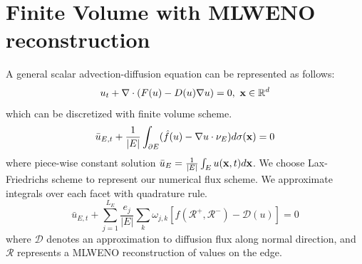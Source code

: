 \section{Finite Volume with MLWENO reconstruction}
A general scalar advection-diffusion equation can be represented as follows:
\begin{equation} \label{eq:newad}
		  u_t + \div (F(u) - D(u) \nabla u) = 0, \ \bfx\in\Re^d
\end{equation}
which can be discretized with finite volume scheme.
\begin{equation}\label{eq:newfv}
		  \bar u_{E,t} + \frac{1}{|E|} \int_{\partial E} (\hat f(u) - \nabla u \cdot \nu_E) d\sigma(\bfx) = 0
\end{equation}
where piece-wise constant solution $\bar{u}_E = \frac{1}{|E|}\int_{E} u({\mathbf x}, t) d{\mathbf x}$. We choose Lax-Friedrichs scheme to
represent our numerical flux scheme.
We approximate integrals over each facet with quadrature rule.
\begin{equation*}
\bar{u}_{E,t} + \sum_{j=1}^{L_E} \frac{e_j}{|E|} \sum_{k} \omega_{j,k} [\hat{f}(\mathscr{R}^+, \mathscr{R}^-) - \mathscr{D}(u)] = 0
\end{equation*}
where $\mathscr{D}$ denotes an approximation to diffusion flux along normal direction, and $\mathscr{R}$ represents a MLWENO
reconstruction of values on the edge.

